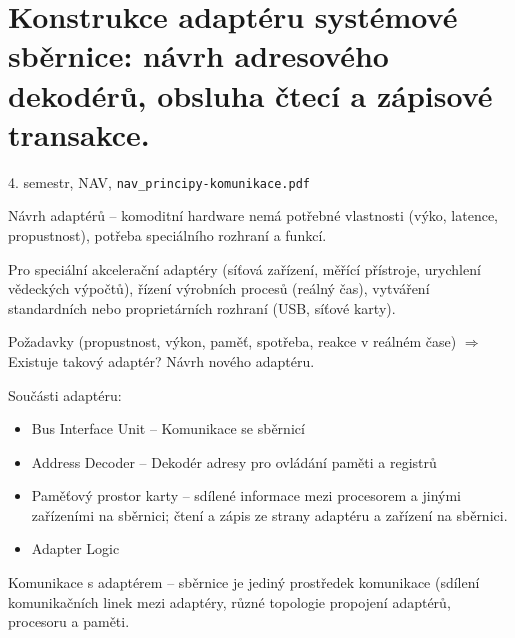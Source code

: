 \documentclass[a4paper, 11pt]{report}
\begin{document}
\chapter{Konstrukce adaptéru systémové sběrnice: návrh adresového dekodérů, obsluha čtecí a zápisové transakce.} \label{cha:62}
4. semestr, NAV, \texttt{nav\_principy-komunikace.pdf}

Návrh adaptérů -- komoditní hardware nemá potřebné vlastnosti (výko, latence, propustnost), potřeba speciálního rozhraní a funkcí.

Pro speciální akcelerační adaptéry (síťová zařízení, měřící přístroje, urychlení vědeckých výpočtů), řízení výrobních procesů (reálný čas), vytváření standardních nebo proprietárních rozhraní (USB, síťové karty).

Požadavky (propustnost, výkon, paměť, spotřeba, reakce v reálném čase) $\Rightarrow$ Existuje takový adaptér? Návrh nového adaptéru.

Součásti adaptéru:
\begin{itemize}
	\item Bus Interface Unit -- Komunikace se sběrnicí
	\item Address Decoder -- Dekodér adresy pro ovládání paměti a registrů
	\item Paměťový prostor karty -- sdílené informace mezi procesorem a jinými zařízeními na sběrnici; čtení a zápis ze strany adaptéru a zařízení na sběrnici.
	\item Adapter Logic
\end{itemize}

Komunikace s adaptérem -- sběrnice je jediný prostředek komunikace (sdílení komunikačních linek mezi adaptéry, různé topologie propojení adaptérů, procesoru a paměti.
\end{document}
